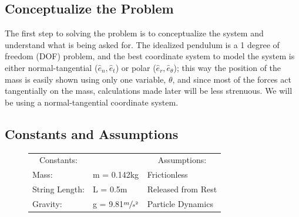 \documentclass[12pt]{report}
\begin{document}

\tableofcontents{}
\newpage
\begin{flushleft}
\section{Conceptualize the Problem}

The first step to solving the problem is to conceptualize the system and understand what is being asked for. The idealized pendulum is a 1 degree of freedom (DOF) problem, and the best coordinate system to model the system is either normal-tangential ($\hat{e}_n,\hat{e}_t$) or polar ($\hat{e}_r,\hat{e}_\theta$); this way the position of the mass is easily shown using only one variable, $\theta$, and since most of the forces act tangentially on the mass, calculations made later will be less strenuous. We will be using a normal-tangential coordinate system.

\subsection{Constants and Assumptions}

\begin{figure}[h]
  \centering
   \begin{minipage}[c]{.2\textwidth}
      
   \end{minipage}%
   \begin{minipage}[c]{.8\textwidth}
     \begin{tabular}{ll@{\hskip .75in}l}
       \multicolumn{1}{c}{Constants:} && \multicolumn{1}{c}{Assumptions:} \\
       Mass: &m = 0.142kg & Frictionless\\
       String Length: &L = 0.5m & Released from Rest\\
       Gravity: &g = 9.81$\sfrac{m}{s^2}$ & Particle Dynamics\\
     \end{tabular}
   \end{minipage}
 \end{figure}


\end{flushleft}
\end{document}
